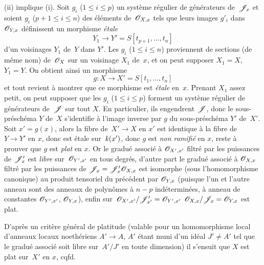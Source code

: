 (ii) implique (i). Soit $g_i$ ($1 \leq i \leq p$) un syst\`eme
r\'egulier de g\'en\'erateurs de~$\cal{J}_x$ et soient $g_i$
($p+1 \leq i \leq n$) des \'el\'ements de~$\cal{O}_{X,x}$ tels que
leurs images $g'_i$ dans $\cal{O}_{Y,x}$ d\'efinissent un morphisme
\emph{étale}
$$
Y_1 \to Y'=S[t_{p+1},\dots, t_n]
$$
d'un voisinages $Y_1$ de~$Y$ dans $Y'$. Les $g_i$ ($1 \leq i \leq n$)
proviennent de sections (de m\^eme nom) de~$\cal{O}_X$ sur un
voisinage $X_1$ de~$x$, et on peut supposer $X_1=X$, $Y_1=Y$. On
obtient ainsi un morphisme
$$
g\colon X \to X'=S[t_1,\dots,t_n]
$$
et tout revient \`a montrer que ce morphisme est \emph{étale}
en~$x$. Prenant $X_1$ assez petit,
on peut supposer que les $g_i$ ($1 \leq i \leq p$) forment un
syst\`eme r\'egulier de g\'en\'erateurs de~$\cal{J}$ sur tout
$X$. En particulier, ils engendrent $\cal{J}$, donc le
sous-pr\'esch\'ema $Y$ de~$X$ s'identifie \`a l'image inverse
par $g$ du sous-pr\'esch\'ema $Y'$ de~$X'$. Soit $x'=g(x)$, alors
la fibre de~$X' \to X$ en $x'$ est
\ignorespaces
identique \`a la fibre de~$Y \to Y'$ en $x$, donc est \'etale sur~$\mathit{k}(x')$, donc $g$ est \emph{non ramifié} en $x$, reste \`a
prouver que $g$ est \emph{plat} en $x$. Or le gradu\'e associ\'e
\`a $\cal{O}_{X',x'}$ filtr\'e par les puissances de
$\cal{J}'_{x}$ est \emph{libre} sur~$\cal{O}_{Y',x'}$ en tous
degr\'es, d'autre part le gradu\'e associ\'e \`a
$\cal{O}_{X,x}$ filtr\'e par les puissances de
$\cal{J}_x=\cal{J}'_x\cal{O}_{X,x}$ est isomorphe (sous
l'homomorphisme canonique) au produit tensoriel du pr\'ec\'edent
par $\cal{O}_{Y,x}$ (puisque l'un et l'autre anneau sont des anneaux
de polyn\^omes \`a $n-p$ ind\'etermin\'ees, \`a anneau de
constantes $\cal{O}_{Y',x'}$, \resp $\cal{O}_{Y,x}$), enfin sur~$\cal{O}_{X',x'}/\cal{J}'_{x'}= \cal{O}_{Y',x'}$
$\cal{O}_{X,x}/\cal{J}_x =\cal{O}_{Y,x}$ est plat.

D'apr\`es un crit\`ere g\'en\'eral de platitude (valable pour
un homomorphisme local d'anneaux locaux noeth\'eriens $A' \to A$,
$A'$ \'etant muni d'un id\'eal $J' \neq A'$ tel que le gradu\'e
associ\'e soit libre sur~$A'/J'$ en toute dimension) il s'ensuit que
$X$ est plat sur~$X'$ en $x$, cqfd.

